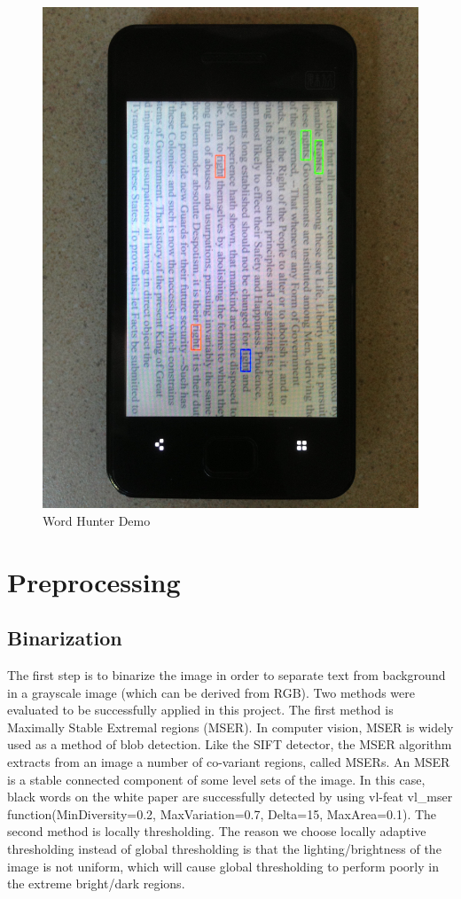 \documentclass[conference]{IEEEtran}
\begin{document}
\begin{figure}
\center
\includegraphics[scale=0.075]{demo_no_skew.jpg}
\caption{Word Hunter Demo}
\end{figure}

\section{Preprocessing}
\subsection{Binarization}

The first step is to binarize the image in order to separate text from background in a grayscale image (which can be derived from RGB).  Two methods were evaluated to be successfully applied in this project. The first method is Maximally Stable Extremal regions (MSER).\cite{Matas}  In computer vision, MSER is widely used as a method of blob detection. Like the SIFT detector, the MSER algorithm extracts from an image a number of co-variant regions, called MSERs. An MSER is a stable connected component of some level sets of the image. In this case, black words on the white paper are successfully detected by using vl-feat vl\_mser function(MinDiversity=0.2, MaxVariation=0.7, Delta=15, MaxArea=0.1). The second method is locally thresholding.  The reason we choose locally adaptive thresholding instead of global thresholding is that the lighting/brightness of the image is not uniform, which will cause global thresholding to perform poorly in the extreme bright/dark regions.
\end{document}
